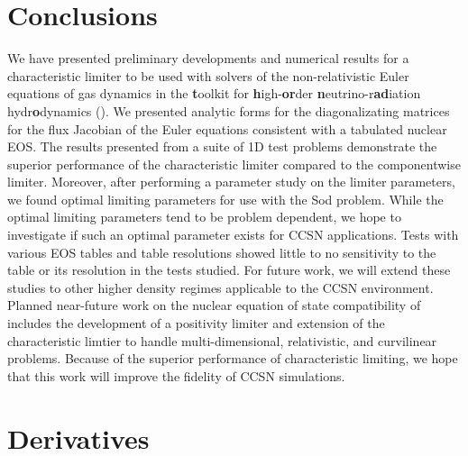 \documentclass[onecolumn]{aastex62}
\begin{document}
\section{Conclusions}

We have presented preliminary developments and numerical results for a
characteristic limiter to be used with solvers of the non-relativistic
Euler equations of gas dynamics in the {\bf t}oolkit for {\bf h}igh-{\bf or}der
{\bf n}eutrino-r{\bf ad}iation hydr{\bf o}dynamics (\thornado). We presented analytic
forms for the diagonalizating matrices for the flux Jacobian of the Euler equations
consistent with a tabulated nuclear EOS.
The results presented from a suite of 1D test problems
demonstrate the superior performance of the characteristic limiter
compared to the componentwise limiter. Moreover, after performing a parameter
study on the limiter parameters, we found optimal limiting
parameters for use with the Sod problem. While the optimal limiting parameters
tend to be problem dependent, we hope to investigate if such an optimal
parameter exists for CCSN applications. Tests with various EOS tables and
table resolutions showed little to no sensitivity to the table or its
resolution in the tests studied. For future work, we will extend these studies
to other higher density regimes applicable to the CCSN environment.
Planned near-future work on the nuclear equation of state compatibility of
\thornado\, includes the development of a positivity limiter and extension of
the characteristic limtier to handle multi-dimensional, relativistic, and curvilinear problems.
Because of the superior performance of characteristic limiting, we hope that
this work will improve the fidelity of CCSN simulations.



\appendix

\section{Derivatives}
\label{appendix:deriv}





\end{document}
